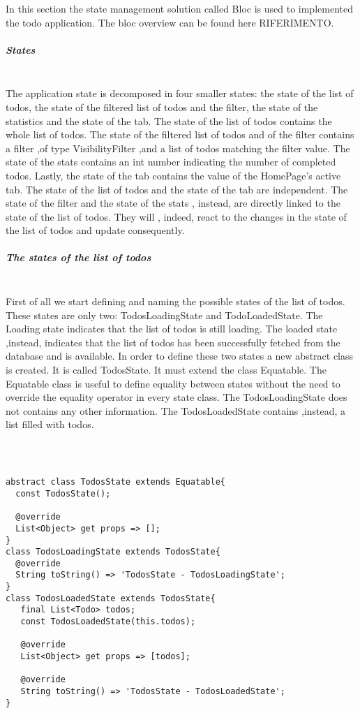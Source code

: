 In this section the state management solution called Bloc is used to implemented the todo application. The bloc overview can be found here RIFERIMENTO.

\subparagraph{States}\mbox{}\\
\label{subpar:todo_app_bloc_core_state}
The application state is decomposed in four smaller states: the state of the list of todos, the state of the filtered list of todos and the filter, the state of the statistics and the state of the tab. The state of the list of todos contains the whole list of todos. The state of the filtered list of todos and of the filter contains a filter ,of type VisibilityFilter ,and a list of todos matching the filter value. The state of the stats contains an int number indicating the number of completed todos. Lastly, the state of the tab contains the value of the HomePage’s active tab. The state of the list of todos and the state of the tab are independent. The state of the filter and the state of the stats , instead, are directly linked to the state of the list of todos. They will , indeed, react to the changes in the state of the list of todos and update consequently. 

\subparagraph{The states of the list of todos}\mbox{}\\
\label{subpar:todo_app_bloc_core_state}
First of all we start defining and naming the possible states of the list of todos. These states are only two: TodosLoadingState and TodoLoadedState. The Loading state indicates that the list of todos is still loading. The loaded state ,instead, indicates that the list of todos has been successfully fetched from the database and is available. In order to define these two states a new abstract class is created. It is called TodosState. It must extend the class Equatable. The  Equatable class is useful to define equality between states without the need to override the equality operator in every state class. The TodosLoadingState does not contains any other information. The TodosLoadedState contains ,instead, a list filled with todos.
\begin{code}
\mbox{}\\
 \mbox{}
\label{code:2.14}
\begin{verbatim}

abstract class TodosState extends Equatable{
  const TodosState();

  @override
  List<Object> get props => [];
}
class TodosLoadingState extends TodosState{
  @override
  String toString() => 'TodosState - TodosLoadingState';
}
class TodosLoadedState extends TodosState{
   final List<Todo> todos;
   const TodosLoadedState(this.todos);

   @override
   List<Object> get props => [todos];

   @override
   String toString() => 'TodosState - TodosLoadedState';
} 
\end{verbatim}
\mbox{}
\end{code}


